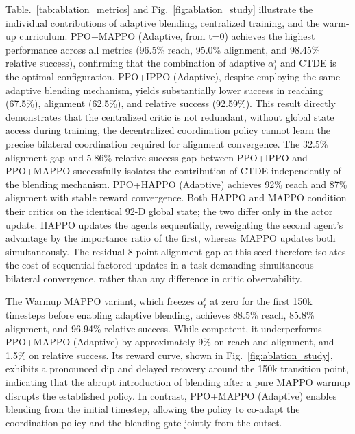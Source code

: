 \documentclass[a4paper,fleqn]{cas-dc}
\begin{document}
Table.~\ref{tab:ablation_metrics} and Fig.~\ref{fig:ablation_study} illustrate the individual contributions of adaptive blending, centralized training, and the warm-up curriculum. PPO+MAPPO (Adaptive, from t=0) achieves the highest performance across all metrics (96.5\% reach, 95.0\% alignment, and 98.45\% relative success), confirming that the combination of adaptive $\alpha^{i}_{t}$ and CTDE is the optimal configuration. PPO+IPPO (Adaptive), despite employing the same adaptive blending mechanism, yields substantially lower success in reaching (67.5\%), alignment (62.5\%), and relative success (92.59\%). This result directly demonstrates that the centralized critic is not redundant, without global state access during training, the decentralized coordination  policy cannot learn the precise bilateral coordination required for alignment convergence. The 32.5\% alignment gap and 5.86\% relative success gap between PPO+IPPO and PPO+MAPPO successfully isolates the contribution of CTDE independently of the blending mechanism. PPO+HAPPO (Adaptive) achieves 92\% reach and 87\% alignment with stable reward convergence. Both HAPPO and MAPPO condition their critics on the identical 92-D global state; the two differ only in the actor update. HAPPO updates the agents sequentially, reweighting the second agent's advantage by the importance ratio of the first, whereas MAPPO updates both simultaneously. The residual 8-point alignment gap at this seed therefore isolates the cost of sequential factored updates in a task demanding simultaneous bilateral convergence, rather than any difference in critic observability.

The Warmup MAPPO variant, which freezes $\alpha^{i}_{t}$ at zero for the first 150k timesteps before enabling adaptive blending, achieves 88.5\% reach, 85.8\% alignment, and 96.94\% relative success. While competent, it underperforms PPO+MAPPO (Adaptive) by approximately 9\% on reach and alignment, and 1.5\% on relative success. Its reward curve, shown in Fig.~\ref{fig:ablation_study}, exhibits a pronounced dip and delayed recovery around the 150k transition point, indicating that the abrupt introduction of blending after a pure MAPPO warmup disrupts the established policy. In contrast, PPO+MAPPO (Adaptive) enables blending from the initial timestep, allowing the policy to co-adapt the coordination policy and the blending gate jointly from the outset.
\end{document}
